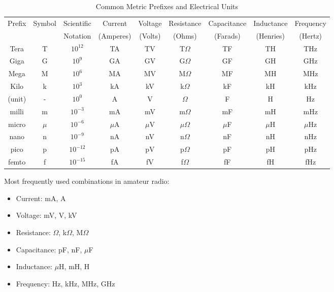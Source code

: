 
\begin{table}[htbp]
    \centering
    \caption{Common Metric Prefixes and Electrical Units}
    \label{tab:metric-prefixes}
    \footnotesize
    \begin{tabular}{|c|c|c|c|c|c|c|c|c|}
        \hline
        Prefix & Symbol & Scientific & Current & Voltage & Resistance & Capacitance & Inductance & Frequency \\
        & & Notation & (Amperes) & (Volts) & (Ohms) & (Farads) & (Henries) & (Hertz) \\
        \hline
        Tera & T & $10^{12}$ & TA & TV & T$\Omega$ & TF & TH & THz \\
        Giga & G & $10^9$ & GA & GV & G$\Omega$ & GF & GH & GHz \\
        Mega & M & $10^6$ & MA & MV & M$\Omega$ & MF & MH & MHz \\
        Kilo & k & $10^3$ & kA & kV & k$\Omega$ & kF & kH & kHz \\
        \hline
        (unit) & - & $10^0$ & A & V & $\Omega$ & F & H & Hz \\
        \hline
        milli & m & $10^{-3}$ & mA & mV & m$\Omega$ & mF & mH & mHz \\
        micro & $\mu$ & $10^{-6}$ & $\mu$A & $\mu$V & $\mu\Omega$ & $\mu$F & $\mu$H & $\mu$Hz \\
        nano & n & $10^{-9}$ & nA & nV & n$\Omega$ & nF & nH & nHz \\
        pico & p & $10^{-12}$ & pA & pV & p$\Omega$ & pF & pH & pHz \\
        femto & f & $10^{-15}$ & fA & fV & f$\Omega$ & fF & fH & fHz \\
        \hline
    \end{tabular}
\end{table}

\begin{tcolorbox}[colback=gray!10!white,colframe=black!75!black,title={Common Usage}]
Most frequently used combinations in amateur radio:
\begin{itemize}
    \item Current: mA, A
    \item Voltage: mV, V, kV
    \item Resistance: $\Omega$, k$\Omega$, M$\Omega$
    \item Capacitance: pF, nF, $\mu$F
    \item Inductance: $\mu$H, mH, H
    \item Frequency: Hz, kHz, MHz, GHz
\end{itemize}
\end{tcolorbox}

